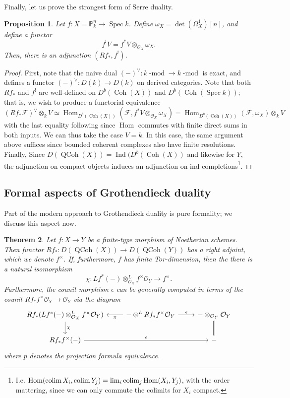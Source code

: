 \documentclass[10pt]{article}
\newtheorem{thm}{Theorem}[section]
\newtheorem{prop}[thm]{Proposition}
\theoremstyle{definition}
\DeclareMathOperator{\Hom}{Hom}
\newcommand{\colim}{\operatornamewithlimits{colim}}
\DeclareMathOperator{\Ind}{Ind}
\DeclareMathOperator{\Coh}{Coh}
\DeclareMathOperator{\dmod}{-mod}
\DeclareMathOperator{\Spec}{Spec}
\DeclareMathOperator{\QCoh}{QCoh}
\newcommand{\PP}{\mathbb{P}}
\newcommand{\OO}{\mathcal{O}}
\begin{document}
Finally, let us prove the strongest form of Serre duality.
\begin{prop}
Let $f: X = \PP^n_k \rightarrow \Spec k$.  Define $\omega_X = \det(\Omega^1_X)[n]$, and define a functor
$$f^! V = f^* V \otimes_{\OO_X} \omega_X.$$
Then, there is an adjunction $(Rf_*, f^!)$.
\end{prop}
\begin{proof}
First, note that the naive dual $(-)^\vee: k\dmod \rightarrow k\dmod$ is exact, and defines a functor $(-)^\vee: D(k) \rightarrow D(k)$ on derived categories.  Note that both $Rf_*$ and $f^!$ are well-defined on $D^b(\Coh(X))$ and $D^b(\Coh(\Spec k))$; that is, we wish to produce a functorial equivalence
$$(Rf_* \mathcal{F})^\vee \otimes_k V \simeq \Hom_{D^b(\Coh(X))}(\mathcal{F}, f^*V \otimes_{\OO_X} \omega_X) = \Hom_{D^b(\Coh(X))}(\mathcal{F}, \omega_X) \otimes_k V$$
with the last equality following since $\Hom$ commutes with finite direct sums in both inputs.  We can thus take the case $V = k$.  In this case, the same argument above suffices since bounded coherent complexes also have finite resolutions.  Finally, Since $D(\QCoh(X)) = \Ind(D^b(\Coh(X))$ and likewise for $Y$, the adjunction on compact objects induces an adjunction on ind-completions\footnote{I.e. $\Hom(\colim X_i, \colim Y_j) = \lim_i \colim_j \Hom(X_i, Y_j)$, with the order mattering, since we can only commute the colimits for $X_i$ compact.}.
\end{proof}




\subsection{Formal aspects of Grothendieck duality}


Part of the modern approach to Grothendieck duality is pure formality; we discuss this aspect now.
\begin{thm}
Let $f: X \rightarrow Y$ be a finite-type morphism of Noetherian schemes.  Then functor $Rf_*: D(\QCoh(X)) \rightarrow D(\QCoh(Y))$ has a right adjoint, which we denote $f^\times$.  If, furthermore, $f$ has finite Tor-dimension, then the there is a natural isomorphism
$$\chi: Lf^*(-) \otimes^L_{\OO_X} f^\times \OO_Y \rightarrow f^\times.$$
Furthermore, the counit morphism $\epsilon$ can be generally computed in terms of the counit $Rf_* f^\times \OO_Y \rightarrow \OO_Y$ via the diagram
$$\begin{tikzcd}
Rf_*(Lf^*(-) \otimes^L_{\OO_X} f^\times \OO_Y) \arrow[d, "\chi"] & - \otimes^L Rf_* f^\times \OO_Y \arrow[l, "\pi"] \arrow[r, "\epsilon"] & - \otimes_{\OO_Y} \OO_Y \arrow[d, equals] \\
Rf_* f^\times(-) \arrow[rr, "\epsilon"] & & -
\end{tikzcd}$$
where $p$ denotes the projection formula equivalence.
\end{thm}
\end{document}
